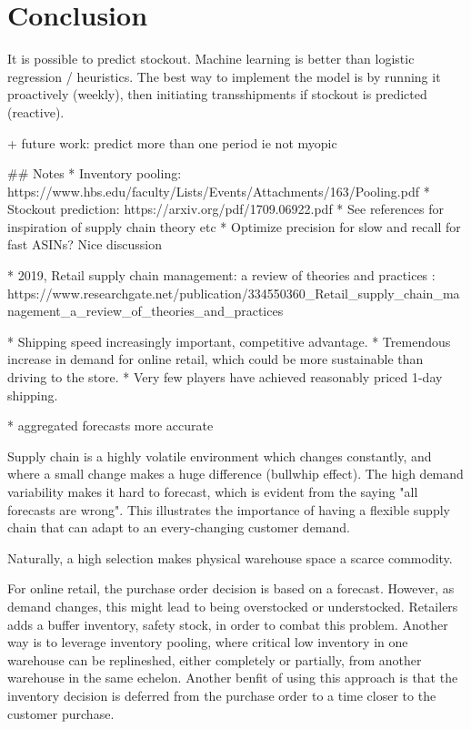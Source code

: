 \documentclass[../../main.tex]{subfiles}
\begin{document}

\chapter{Conclusion}

It is possible to predict stockout. Machine learning is better than logistic regression / heuristics. The best way to implement the model is by running it proactively (weekly), then initiating transshipments if stockout is predicted (reactive). 

+ future work: predict more than one period ie not myopic

## Notes
* Inventory pooling: https://www.hbs.edu/faculty/Lists/Events/Attachments/163/Pooling.pdf
* Stockout prediction: https://arxiv.org/pdf/1709.06922.pdf
    * See references for inspiration of supply chain theory etc
* Optimize precision for slow and recall for fast ASINs? Nice discussion

* 2019, Retail supply chain management: a review of theories and practices : https://www.researchgate.net/publication/334550360_Retail_supply_chain_management_a_review_of_theories_and_practices

* Shipping speed increasingly important, competitive advantage.
* Tremendous increase in demand for online retail, which could be more sustainable than driving to the store.
* Very few players have achieved reasonably priced 1-day shipping.

* aggregated forecasts more accurate

Supply chain is a highly volatile environment which changes constantly, and where a small change makes a huge difference (bullwhip effect). The high demand variability makes it hard to forecast, which is evident from the saying "all forecasts are wrong". This illustrates the importance of having a flexible supply chain that can adapt to an every-changing customer demand.

Naturally, a high selection makes physical warehouse space a scarce commodity. 

For online retail, the purchase order decision is based on a forecast. However, as demand changes, this might lead to being overstocked or understocked. Retailers adds a buffer inventory, safety stock, in order to combat this problem. Another way is to leverage inventory pooling, where critical low inventory in one warehouse can be replineshed, either completely or partially, from another warehouse in the same echelon. Another benfit of using this approach is that the inventory decision is deferred from the purchase order to a time closer to the customer purchase.
\end{document}
